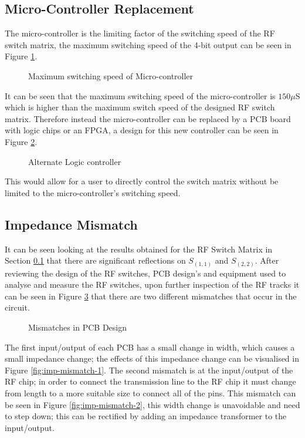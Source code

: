 \documentclass[12pt,openany,a4paper]{book}
\begin{document}
\subsection{Micro-Controller Replacement}
The micro-controller is the limiting factor of the switching speed of the RF switch matrix, the maximum switching speed of the 4-bit output can be seen in Figure \ref{fig:micro-switchspeed}.
\begin{figure}[H]
	\centering
	\caption{Maximum switching speed of Micro-controller}
	\label{fig:micro-switchspeed}
\end{figure} 
It can be seen that the maximum switching speed of the micro-controller is $150 \mu$S which is higher than the maximum switch speed of the designed RF switch matrix. Therefore instead the micro-controller can be replaced by a PCB board with logic chips or an FPGA, a design for this new controller can be seen in Figure \ref{fig:micro-logic-replacement}.
\begin{figure}[H]
	\centering
	\caption{Alternate Logic controller}
	\label{fig:micro-logic-replacement}
\end{figure} 
This would allow for a user to directly control the switch matrix without be limited to the micro-controller's switching speed.





%		
\subsection{Impedance Mismatch}	\label{sec:imp-mismatch}
It can be seen looking at the results obtained for the RF Switch Matrix in Section \ref{} that there are significant reflections on $S_{(1,1)}$ and $S_{(2,2)}$. After reviewing the design of the RF switches, PCB design's and equipment used to analyse and measure the RF switches, upon further inspection of the RF tracks it can be seen in Figure \ref{fig:pcb-mismatch} that there are two different mismatches that occur in the circuit.
\begin{figure}[H]
	\centering
	\caption{Mismatches in PCB Design}
	\label{fig:pcb-mismatch}
\end{figure} 
The first input/output of each PCB has a small change in width, which causes a small impedance change; the effects of this impedance change can be visualised in Figure \ref{fig:imp-mismatch-1}. The second mismatch is at the input/output of the RF chip; in order to connect the transmission line to the RF chip it must change from length to a more suitable size to connect all of the pins. This mismatch can be seen in Figure \ref{fig:imp-mismatch-2}, this width change is unavoidable and need to step down; this can be rectified by adding an impedance transformer to the input/output.
\end{document}
